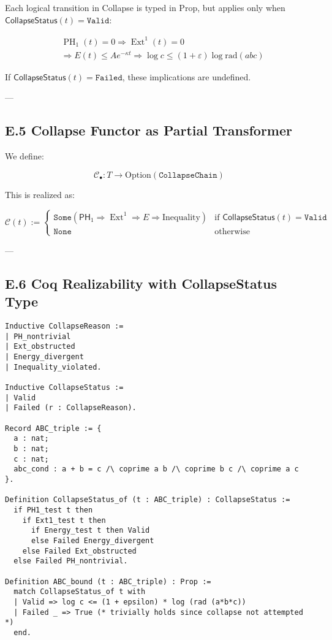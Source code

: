 \documentclass[11pt]{article}
\DeclareMathOperator{\Ext}{Ext}
\DeclareMathOperator{\PH}{PH}
\begin{document}
Each logical transition in Collapse is typed in Prop, but applies only when \( \mathsf{CollapseStatus}(t) = \texttt{Valid} \):

\[
\begin{aligned}
& \PH_1(t) = 0 \Rightarrow \Ext^1(t) = 0 \\
& \Rightarrow E(t) \leq Ae^{-\kappa t} \Rightarrow \log c \leq (1+\varepsilon) \log \mathrm{rad}(abc)
\end{aligned}
\]

If \( \mathsf{CollapseStatus}(t) = \texttt{Failed} \), these implications are undefined.

---

\subsection*{E.5 Collapse Functor as Partial Transformer}

We define:

\[
\mathcal{C}_\bullet : T \to \mathrm{Option}(\texttt{CollapseChain})
\]

This is realized as:

\[
\mathcal{C}(t) := 
\begin{cases}
\texttt{Some}(\mathsf{PH}_1 \Rightarrow \Ext^1 \Rightarrow E \Rightarrow \text{Inequality}) & \text{if } \mathsf{CollapseStatus}(t) = \texttt{Valid} \\
\texttt{None} & \text{otherwise}
\end{cases}
\]

---

\subsection*{E.6 Coq Realizability with CollapseStatus Type}

\begin{verbatim}
Inductive CollapseReason :=
| PH_nontrivial
| Ext_obstructed
| Energy_divergent
| Inequality_violated.

Inductive CollapseStatus :=
| Valid
| Failed (r : CollapseReason).

Record ABC_triple := {
  a : nat;
  b : nat;
  c : nat;
  abc_cond : a + b = c /\ coprime a b /\ coprime b c /\ coprime a c
}.

Definition CollapseStatus_of (t : ABC_triple) : CollapseStatus :=
  if PH1_test t then
    if Ext1_test t then
      if Energy_test t then Valid
      else Failed Energy_divergent
    else Failed Ext_obstructed
  else Failed PH_nontrivial.

Definition ABC_bound (t : ABC_triple) : Prop :=
  match CollapseStatus_of t with
  | Valid => log c <= (1 + epsilon) * log (rad (a*b*c))
  | Failed _ => True (* trivially holds since collapse not attempted *)
  end.
\end{verbatim}
\end{document}
